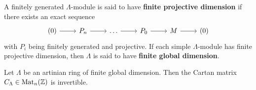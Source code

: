 %




\begin{definition}
A finitely generated $\Lambda$-module is said to have \textbf{finite projective dimension} if there exists an exact sequence
%
\[
\begin{tikzcd}
(0) \rar & P_n \rar & \dots \rar & P_0 \rar & M \rar & (0)
\end{tikzcd}
\]
%
with $P_i$ being finitely generated and projective. If each simple $\Lambda$-module has finite projective dimension, then $\Lambda$ is said to have \textbf{finite global dimension}.
\end{definition}


\begin{proposition}\label{1.4.8}
Let $\Lambda$ be an artinian ring of finite global dimension. Then the Cartan matrix $C_\Lambda\in\operatorname{Mat}_n(\mathbb{Z})$ is invertible. 
\end{proposition}


